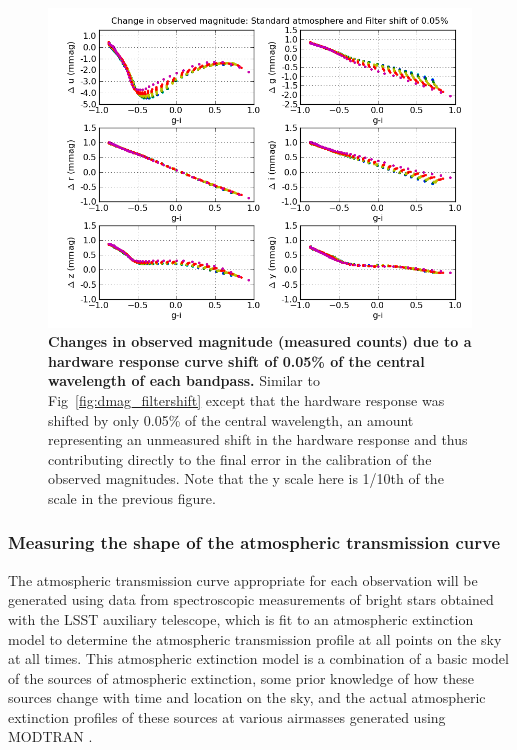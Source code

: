 \documentclass[12pt,preprint]{aastex}
\begin{document}
\begin{figure}
\centering
\includegraphics[width=6in]{delta_mags_filtershift_small}
\caption{{\small 
{\bf Changes in observed magnitude (measured counts) due to a hardware
response curve shift of 0.05\% of the central wavelength of each
bandpass.} Similar to Fig~\ref{fig:dmag_filtershift} except that the
hardware response was shifted by only 0.05\% of the central
wavelength, an amount representing an unmeasured shift in the hardware
response and thus contributing directly to the final error in the
calibration of the observed magnitudes. Note that the y scale here is 1/10th
of the scale in the previous figure. }}
\label{fig:dmag_filtershift_small} 
\end{figure}
 

\subsubsection{Measuring the shape of the atmospheric transmission curve}
\label{sec:phi_atmo}

The atmospheric transmission curve appropriate for each observation
will be generated using data from spectroscopic measurements of bright
stars obtained with the LSST auxiliary telescope, which is fit to an atmospheric 
extinction model to determine the atmospheric transmission profile at all
points on the sky at all times. This atmospheric extinction model is a combination of 
a basic model of the sources of atmospheric extinction, some prior knowledge
of how these sources change with time and location on the sky, and the actual
atmospheric extinction profiles of these sources at various airmasses generated
using MODTRAN \citep{modtran4a, modtran4b}.
\end{document}
